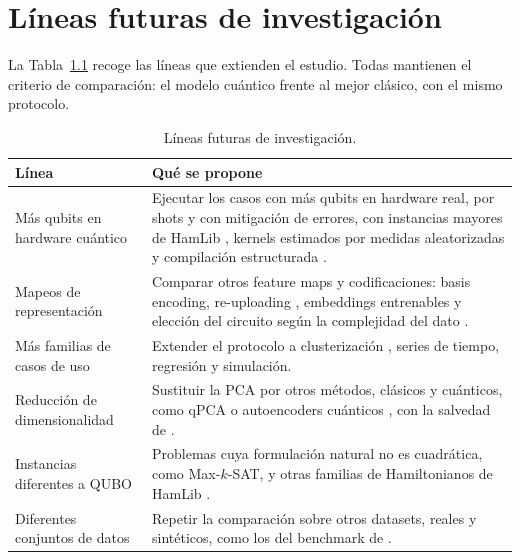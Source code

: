 \chapter{Líneas futuras de investigación}
\label{cap:futuro}

La Tabla~\ref{tab:futuro} recoge las líneas que extienden el estudio. Todas mantienen el criterio de comparación: el modelo cuántico frente al mejor clásico, con el mismo protocolo.

\begin{table}[!htbp]
\centering
\footnotesize
\renewcommand{\arraystretch}{1.1}
\begin{tabularx}{\textwidth}{@{}>{\raggedright\arraybackslash}p{}>{\raggedright\arraybackslash}X@{}}
\toprule
\textbf{Línea} & \textbf{Qué se propone} \\
\midrule
Más qubits en hardware cuántico & Ejecutar los casos con más qubits en hardware real, por shots y con mitigación de errores, con instancias mayores de HamLib \citep{sawaya2024hamlib, pennylaneHamlibTsp}, kernels estimados por medidas aleatorizadas \citep{haug2023} y compilación estructurada \citep{rovara2026}. \\
\addlinespace
Mapeos de representación & Comparar otros feature maps y codificaciones: basis encoding, re-uploading \citep{perezSalinas2020}, embeddings entrenables \citep{lloyd2020} y elección del circuito según la complejidad del dato \citep{dePaulaNeto2025}. \\
\addlinespace
Más familias de casos de uso & Extender el protocolo a clusterización \citep{aimeur2007, sentis2019, kerenidis2019qmeans}, series de tiempo, regresión \citep{friedman1991, kulkarniQlr} y simulación. \\
\addlinespace
Reducción de dimensionalidad & Sustituir la PCA por otros métodos, clásicos y cuánticos, como qPCA o autoencoders cuánticos \citep{lloyd2014, romero2017}, con la salvedad de \citet{tang2021}. \\
\addlinespace
Instancias diferentes a QUBO & Problemas cuya formulación natural no es cuadrática, como Max-$k$-SAT, y otras familias de Hamiltonianos de HamLib \citep{sawaya2024hamlib}. \\
\addlinespace
Diferentes conjuntos de datos & Repetir la comparación sobre otros datasets, reales y sintéticos, como los del benchmark de \citet{bowles2024}. \\
\bottomrule
\end{tabularx}
\caption{Líneas futuras de investigación.}
\label{tab:futuro}
\end{table}
